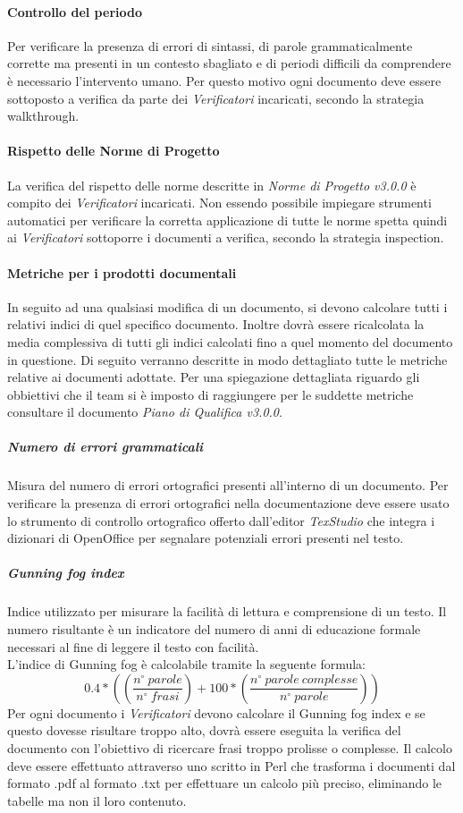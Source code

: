 \paragraph{Controllo del periodo} \Spazio
Per verificare la presenza di errori di sintassi, di parole grammaticalmente corrette ma presenti in un contesto sbagliato e di periodi difficili da comprendere è necessario l'intervento umano. Per questo motivo ogni documento deve essere sottoposto a verifica da parte dei \emph{Verificatori} incaricati, secondo la strategia walkthrough.

\paragraph{Rispetto delle Norme di Progetto} \Spazio
La verifica del rispetto delle norme descritte in \emph{Norme di Progetto v3.0.0} è compito dei \emph{Verificatori} incaricati. Non essendo possibile impiegare strumenti automatici per verificare la corretta applicazione di tutte le norme spetta quindi ai \emph{Verificatori} sottoporre i documenti a verifica, secondo la strategia inspection.

\paragraph{Metriche per i prodotti documentali} \Spazio
In seguito ad una qualsiasi modifica di un documento, si devono calcolare tutti i relativi indici di quel specifico documento. Inoltre dovrà essere ricalcolata la media complessiva di tutti gli indici calcolati fino a quel momento del documento in questione.
Di seguito verranno descritte in modo dettagliato tutte le metriche relative ai documenti adottate. Per una spiegazione dettagliata riguardo gli obbiettivi che il team si è imposto di raggiungere per le suddette metriche consultare il documento \emph{Piano di Qualifica v3.0.0}.
\subparagraph{Numero di errori grammaticali}\Spazio
Misura del numero di errori ortografici presenti all'interno di un documento.
Per verificare la presenza di errori ortografici nella documentazione deve essere usato lo strumento di controllo ortografico offerto dall'editor \emph{TexStudio} che integra i dizionari di OpenOffice per segnalare potenziali errori presenti nel testo.

\subparagraph{Gunning fog index}\Spazio
Indice utilizzato per misurare la facilità di lettura e comprensione di un testo. Il numero risultante è un indicatore del numero di anni di educazione formale necessari al fine di leggere il testo con facilità. \\
L'indice di Gunning fog è calcolabile tramite la seguente formula:
$$
0.4*((\frac{n^{\circ}\:parole}{n^{\circ}\:frasi})+100*(\frac{n^{\circ}\:parole\:complesse}{n^{\circ}\:parole}))
$$
Per ogni documento i \emph{Verificatori} devono calcolare il Gunning fog index e se questo dovesse risultare troppo alto, dovrà essere eseguita la verifica del documento con l'obiettivo di ricercare frasi troppo prolisse o complesse. Il calcolo deve essere effettuato attraverso uno  scritto in Perl che trasforma i documenti dal formato .pdf al formato .txt per effettuare un calcolo più preciso, eliminando le tabelle ma non il loro contenuto.

